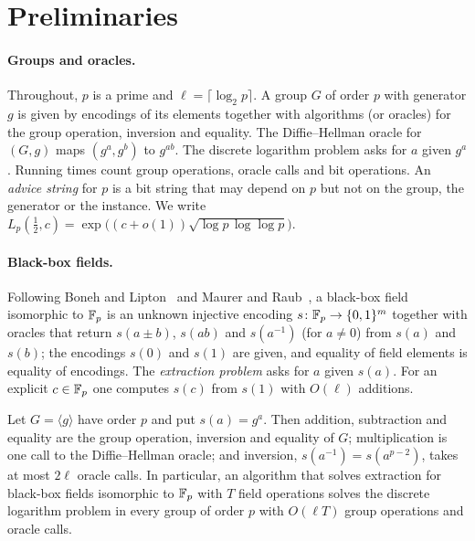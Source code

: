 \section{Preliminaries}\label{sec:prelim}

\paragraph{Groups and oracles.}
Throughout, $p$ is a prime and $\ell=\lceil\log_2 p\rceil$. A group $G$ of order $p$ with generator $g$ is
given by encodings of its elements together with algorithms (or oracles) for the group operation,
inversion and equality. The Diffie--Hellman oracle for $(G,g)$ maps $(g^a,g^b)$ to $g^{ab}$. The discrete
logarithm problem asks for $a$ given $g^a$. Running times count group operations, oracle calls and bit
operations. An \emph{advice string} for $p$ is a bit string that may depend on $p$ but not on the group, the
generator or the instance. We write $L_p(\tfrac12,c)=\exp\bigl((c+o(1))\sqrt{\log p\,\log\log p}\bigr)$.

\paragraph{Black-box fields.}
Following Boneh and Lipton~\cite{BL96} and Maurer and Raub~\cite{MR07}, a black-box field isomorphic to
$\mathbb{F}_p$ is an unknown injective encoding $s\colon\mathbb{F}_p\to\{0,1\}^m$ together with oracles that return
$s(a\pm b)$, $s(ab)$ and $s(a^{-1})$ (for $a\neq 0$) from $s(a)$ and $s(b)$; the encodings $s(0)$ and $s(1)$
are given, and equality of field elements is equality of encodings. The \emph{extraction problem} asks for
$a$ given $s(a)$. For an explicit $c\in\mathbb{F}_p$ one computes $s(c)$ from $s(1)$ with $O(\ell)$ additions.

\begin{lemma}\label{lem:dh-bbf}
Let $G=\langle g\rangle$ have order $p$ and put $s(a)=g^a$. Then addition, subtraction and equality are the
group operation, inversion and equality of $G$; multiplication is one call to the Diffie--Hellman oracle;
and inversion, $s(a^{-1})=s(a^{p-2})$, takes at most $2\ell$ oracle calls. In particular, an algorithm that
solves extraction for black-box fields isomorphic to $\mathbb{F}_p$ with $T$ field operations solves the discrete
logarithm problem in every group of order $p$ with $O(\ell T)$ group operations and oracle calls.
\end{lemma}

